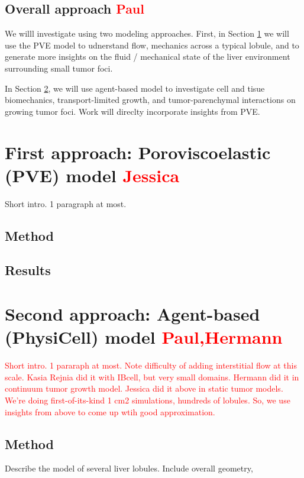 \documentclass[smallextended,natbib,draft]{svjour3}
\newcommand{\red}[1]{\textcolor{red}{#1}}
\begin{document}

\subsection{Overall approach \red{Paul}}
We willl investigate using two modeling approaches. First, in Section 
\ref{section:PVE} we will use the PVE model to udnerstand flow, 
mechanics across a typical lobule, and to generate more insights on 
the fluid / mechanical state of the liver environment surrounding 
small tumor foci. 

In Section \ref{section:ABM}, we will use agent-based model 
to investigate cell and tisue biomechanics, transport-limited 
growth, and tumor-parenchymal interactions on growing tumor foci. 
Work will direclty incorporate insights from PVE. 


\section{First approach: Poroviscoelastic (PVE) model \red{Jessica}}
\label{section:PVE}
Short intro. 1 paragraph at most. 

\subsection{Method}
\subsection{Results}

\vfill
\pagebreak

\section{Second approach: Agent-based (PhysiCell) model \red{Paul,Hermann}}
\label{section:ABM}
\red{Short intro. 1 pararaph at most.  Note difficulty of adding interstitial flow at this scale. 
Kasia Rejnia did it with IBcell, but very small domains. Hermann did it in continuum tumor growth 
model. Jessica did it above in static tumor models. We're doing first-of-its-kind 1 cm2 
simulations, hundreds of lobules. So, we use insights from above to come up wtih good approximation. }

\subsection{Method} 
Describe the model of several liver lobules.  Include overall geometry, 
\end{document}
